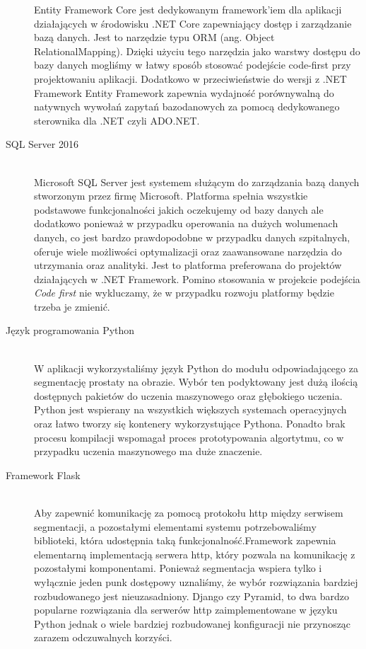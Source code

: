 \documentclass[a4paper,11pt,twoside]{report}
\theoremstyle{definition}
\begin{document}
\begin{description}
Entity Framework Core jest dedykowanym framework'iem dla aplikacji działających w środowisku .NET Core zapewniający dostęp i zarządzanie bazą danych. Jest to narzędzie typu ORM (ang. Object RelationalMapping). Dzięki użyciu tego narzędzia jako warstwy dostępu do bazy danych mogliśmy w łatwy sposób stosować podejście code-first przy projektowaniu aplikacji. Dodatkowo w przeciwieństwie do wersji z .NET Framework Entity Framework zapewnia wydajność porównywalną do natywnych wywołań zapytań bazodanowych za pomocą dedykowanego sterownika dla .NET czyli ADO.NET.
\item [SQL Server 2016] \hfill \\
Microsoft SQL Server jest systemem służącym do zarządzania bazą danych stworzonym przez firmę Microsoft. Platforma spełnia wszystkie podstawowe funkcjonalności jakich oczekujemy od bazy danych ale dodatkowo ponieważ w przypadku operowania na dużych wolumenach danych, co jest bardzo prawdopodobne w przypadku danych szpitalnych, oferuje wiele możliwości optymalizacji oraz zaawansowane narzędzia do utrzymania oraz analityki. Jest to platforma preferowana do projektów działających w .NET Framework. Pomino stosowania w projekcie podejścia \textit{Code first} nie wykluczamy, że w przypadku rozwoju platformy będzie trzeba je zmienić.
\item [Język programowania Python ] \hfill \\
W aplikacji wykorzystaliśmy język Python do modułu odpowiadającego za segmentację prostaty na obrazie. Wybór ten podyktowany jest dużą ilością dostępnych pakietów do uczenia maszynowego oraz głębokiego uczenia. Python jest wspierany na wszystkich większych systemach operacyjnych oraz łatwo tworzy się kontenery wykorzystujące Pythona. Ponadto brak procesu kompilacji wspomagał proces prototypowania algortytmu, co w przypadku uczenia maszynowego ma duże znaczenie. 
\item [Framework Flask ] \hfill \\
Aby zapewnić komunikację za pomocą protokołu http między serwisem segmentacji, a pozostałymi elementami systemu potrzebowaliśmy biblioteki, która udostępnia taką funkcjonalność.Framework zapewnia elementarną implementacją serwera http, który pozwala na komunikację z pozostałymi komponentami. Ponieważ segmentacja wspiera tylko i wyłącznie jeden punk dostępowy uznaliśmy, że wybór rozwiązania bardziej rozbudowanego jest nieuzasadniony. Django czy Pyramid, to dwa bardzo popularne rozwiązania dla serwerów http zaimplementowane w języku Python jednak o wiele bardziej rozbudowanej konfiguracji nie przynosząc zarazem odczuwalnych korzyści.

\end{description}
\end{document}
